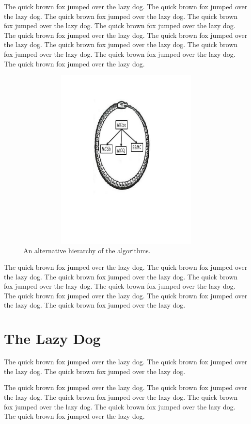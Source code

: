 \documentclass{l4proj}
\begin{document}
The quick brown fox jumped over the lazy dog.
The quick brown fox jumped over the lazy dog.
The quick brown fox jumped over the lazy dog.
The quick brown fox jumped over the lazy dog.
The quick brown fox jumped over the lazy dog.
The quick brown fox jumped over the lazy dog.
The quick brown fox jumped over the lazy dog.
The quick brown fox jumped over the lazy dog.
The quick brown fox jumped over the lazy dog.
The quick brown fox jumped over the lazy dog.
The quick brown fox jumped over the lazy dog.

\begin{figure}
\centering
\includegraphics[height=9.2cm,width=13.2cm]{uroboros.pdf}
\vspace{-30mm}
\caption{An alternative hierarchy of the algorithms.}
\label{uroborus}
\end{figure}

The quick brown fox jumped over the lazy dog.
The quick brown fox jumped over the lazy dog.
The quick brown fox jumped over the lazy dog.
The quick brown fox jumped over \cite{ckt} the lazy dog.
The quick brown fox jumped over the lazy dog.
The quick brown fox jumped over the lazy dog.
The quick brown fox jumped over the lazy dog.
The quick brown fox jumped over the lazy dog.

\section{The Lazy Dog}
The quick brown fox jumped over the lazy dog.
The quick brown fox jumped over the lazy dog.
The quick brown fox jumped over the lazy dog.

The quick brown fox jumped over the lazy dog.
The quick brown fox \cite{am97} jumped over the lazy dog.
The quick brown fox jumped over the lazy dog.
The quick brown fox jumped over the lazy dog.
The quick brown fox jumped over the lazy dog.
The quick brown fox jumped over the lazy dog.
\end{document}
